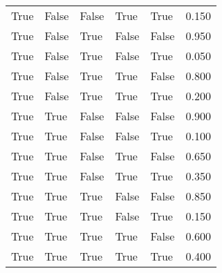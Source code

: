 \begin{tabular}{lllllr}
        True &         False &                False &     True &          True & 0.150 \\
        True &         False &                 True &    False &         False & 0.950 \\
        True &         False &                 True &    False &          True & 0.050 \\
        True &         False &                 True &     True &         False & 0.800 \\
        True &         False &                 True &     True &          True & 0.200 \\
        True &          True &                False &    False &         False & 0.900 \\
        True &          True &                False &    False &          True & 0.100 \\
        True &          True &                False &     True &         False & 0.650 \\
        True &          True &                False &     True &          True & 0.350 \\
        True &          True &                 True &    False &         False & 0.850 \\
        True &          True &                 True &    False &          True & 0.150 \\
        True &          True &                 True &     True &         False & 0.600 \\
        True &          True &                 True &     True &          True & 0.400 \\
\bottomrule
\end{tabular}

